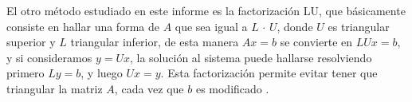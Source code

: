 El otro método estudiado en este informe es la factorización LU, que básicamente consiste en hallar
una forma de $A$ que sea igual a $L$ $\cdot$ $U$, donde $U$ es triangular superior y $L$ triangular
inferior, de esta manera $Ax=b$ se convierte en $LUx=b$, y si consideramos $y=Ux$, la solución al
sistema puede hallarse resolviendo primero $Ly=b$, y luego $Ux=y$. Esta factorización permite evitar
tener que triangular la matriz $A$, cada vez que $b$ es modificado \cite[6.5]{burden}.
